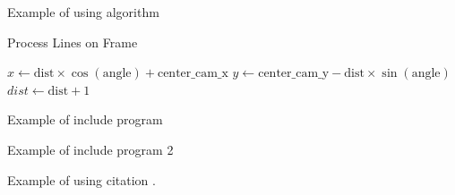 Example of using algorithm
\begin{algorithm}[H]
    \caption{Process Lines on Frame}\label{alg:process_lines}
    \begin{algorithmic}[1]
        \State {}
            \State {}
                \State $x \gets \text{dist} \times \cos(\text{angle}) + \text{center\_cam\_x}$
                \State $y \gets \text{center\_cam\_y} - \text{dist} \times \sin(\text{angle})$
                    \State {}
                \EndIf
                \State $dist \gets \text{dist} + 1$
            \EndFor
        \EndFor
    \EndProcedure
    \end{algorithmic}
\end{algorithm}


Example of include program 


Example of include program 2



Example of using citation \cite{ref_url1}.
